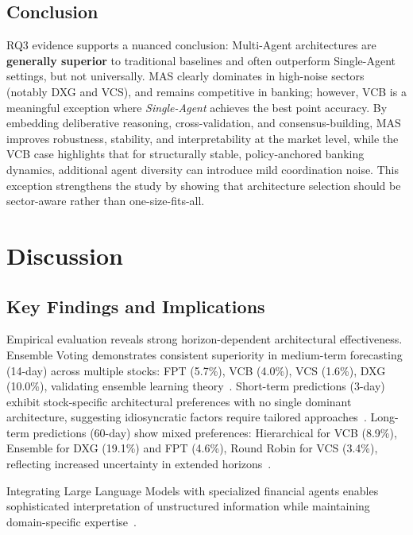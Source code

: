 \documentclass{ieeeaccess}
\begin{document}
\subsection{Conclusion}
RQ3 evidence supports a nuanced conclusion: Multi-Agent architectures are \textbf{generally superior} to traditional baselines and often outperform Single-Agent settings, but not universally. MAS clearly dominates in high-noise sectors (notably DXG and VCS), and remains competitive in banking; however, VCB is a meaningful exception where \textit{Single-Agent} achieves the best point accuracy. By embedding deliberative reasoning, cross-validation, and consensus-building, MAS improves robustness, stability, and interpretability at the market level, while the VCB case highlights that for structurally stable, policy-anchored banking dynamics, additional agent diversity can introduce mild coordination noise. This exception strengthens the study by showing that architecture selection should be sector-aware rather than one-size-fits-all.

\section{Discussion}
\subsection{Key Findings and Implications}
Empirical evaluation reveals strong horizon-dependent architectural effectiveness. Ensemble Voting demonstrates consistent superiority in medium-term forecasting (14-day) across multiple stocks: FPT (5.7\%), VCB (4.0\%), VCS (1.6\%), DXG (10.0\%), validating ensemble learning theory~\cite{dietterich2000ensemble}. Short-term predictions (3-day) exhibit stock-specific architectural preferences with no single dominant architecture, suggesting idiosyncratic factors require tailored approaches~\cite{campbell1997stock}. Long-term predictions (60-day) show mixed preferences: Hierarchical for VCB (8.9\%), Ensemble for DXG (19.1\%) and FPT (4.6\%), Round Robin for VCS (3.4\%), reflecting increased uncertainty in extended horizons~\cite{guidolin2007asset}.

Integrating Large Language Models with specialized financial agents enables sophisticated interpretation of unstructured information while maintaining domain-specific expertise~\cite{kenton2019bert,tetlock2007giving}.
\end{document}
